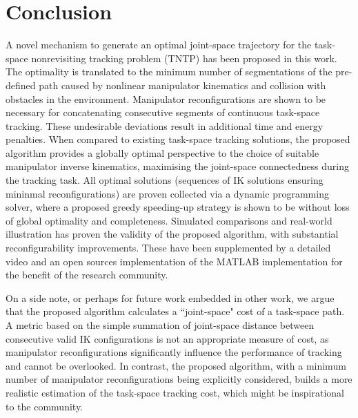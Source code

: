 \documentclass[letterpaper, 10 pt, conference]{ieeeconf}  %
\begin{document}
\section{Conclusion}\label{section:conclusion}
A novel mechanism to generate an optimal joint-space trajectory for the task-space nonrevisiting tracking problem (TNTP) has been proposed in this work. 
The optimality is translated to the minimum number of segmentations of the pre-defined path caused by nonlinear manipulator kinematics and collision with obstacles in the environment. 
Manipulator reconfigurations are shown to be necessary for concatenating consecutive segments of continuous task-space tracking. These undesirable deviations result in additional time and energy penalties.
When compared to existing task-space tracking solutions, the proposed algorithm provides a globally optimal perspective to the choice of suitable manipulator inverse kinematics, 
maximising the joint-space connectedness during the tracking task. 
All optimal solutions (sequences of IK solutions ensuring mininmal reconfigurations) are proven collected via a dynamic programming solver, where a proposed greedy speeding-up strategy is shown to be without loss of global optimality and completeness. 
Simulated comparisons and real-world illustration has proven the validity of the proposed algorithm, with substantial reconfigurability improvements. 
These have been supplemented by a detailed video and an open sources implementation of the MATLAB implementation for the benefit of the research community. 

On a side note, or perhaps for future work embedded in other work, we argue that the proposed algorithm calculates a ``joint-space" cost of a task-space path. 
A metric based on the simple summation of joint-space distance between consecutive valid IK configurations is not an appropriate measure of cost, as manipulator reconfigurations significantly influence the performance of tracking and cannot be overlooked. 
In contrast, the proposed algorithm, with a minimum number of manipulator reconfigurations being explicitly considered, builds a more realistic estimation of the task-space tracking cost, which might be inspirational to the community. 











\newpage
\end{document}
